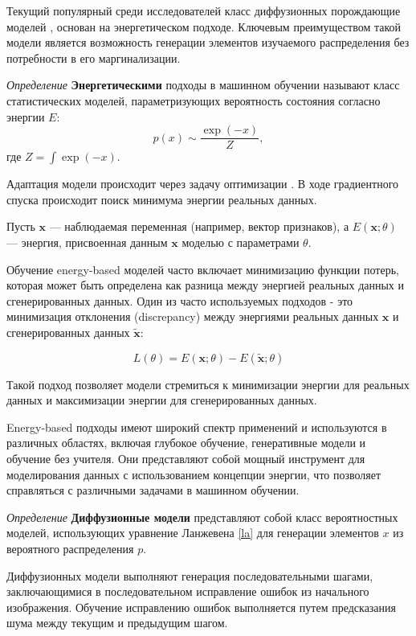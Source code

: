 Текущий популярный среди исследователей класс диффузионных порождающие 
моделей \cite{song2020score}, основан на энергетическом подходе. 
Ключевым преимуществом такой модели является возможность генерации 
элементов изучаемого распределения без потребности в его маргинализации.

\textit{Определение} \textbf{Энергетическими} подходы в машинном обучении 
называют класс статистических моделей, параметризующих вероятность 
состояния согласно энергии $E$:
\begin{equation}
    p(x) \sim \frac{\exp(-x)}{Z},
\end{equation}
где $Z=\int \exp(-x)$. 


Адаптация модели происходит через задачу оптимизации \cite{lecun2006tutorial}.
В ходе градиентного спуска происходит поиск минимума энергии реальных данных.

Пусть \( \mathbf{x} \) — наблюдаемая переменная (например, вектор признаков),
 а \( E(\mathbf{x}; \theta) \) — энергия, присвоенная данным \( \mathbf{x} \) моделью с параметрами \( \theta \). 

Обучение energy-based моделей часто включает минимизацию функции потерь, которая может быть определена как разница между энергией реальных данных и сгенерированных данных. Один из часто используемых подходов - это минимизация отклонения (discrepancy) между энергиями реальных данных \( \mathbf{x} \) и сгенерированных данных \( \tilde{\mathbf{x}} \):

\[ L(\theta) = E(\mathbf{x}; \theta) - E(\tilde{\mathbf{x}}; \theta) \]

Такой подход позволяет модели стремиться к минимизации энергии для реальных данных и максимизации энергии для сгенерированных данных.

Energy-based подходы имеют широкий спектр применений и используются в различных областях, включая глубокое обучение, генеративные модели и обучение без учителя. Они представляют собой мощный инструмент для моделирования данных с использованием концепции энергии, что позволяет справляться с различными задачами в машинном обучении.


\textit{Определение} \textbf{Диффузионные модели} \label{diffusion} представляют собой класс вероятностных моделей, 
использующих уравнение Ланжевена \ref{la} для генерации элементов $x$ из вероятного распределения $p$.

Диффузионных модели выполняют генерация последовательными шагами, заключающимися 
в последовательном исправление ошибок из начального изображения. 
Обучение исправлению ошибок выполняется путем предсказания шума между текущим и предыдущим шагом.

